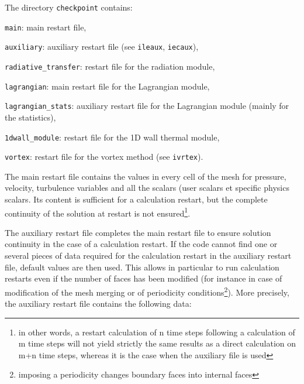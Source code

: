 {{{The directory \texttt{checkpoint} contains:
\begin{list}{-}{}
\item \texttt{main}: main restart file,
\item \texttt{auxiliary}: auxiliary restart file (see \texttt{ileaux},
                       \texttt{iecaux}),
\item \texttt{radiative\_transfer}: restart file for the radiation module,
\item \texttt{lagrangian}: main restart file for the Lagrangian module,
\item \texttt{lagrangian\_stats}: auxiliary restart file for the Lagrangian module (mainly for the statistics),
\item \texttt{1dwall\_module}: restart file for the 1D wall thermal module,
\item \texttt{vortex}: restart file for the vortex method (see
                       \texttt{ivrtex}).
\end{list}

The main restart file contains the values in every cell of the mesh for
pressure, velocity, turbulence variables and all the scalars (user scalars et specific physics scalars.
Its content is sufficient for a calculation restart, but the complete continuity of the solution at
restart is not ensured\footnote{in other words, a restart calculation of n time
steps following a calculation of m time steps will not yield strictly the same
results as a direct calculation on m+n time steps, whereas it is the case when
the auxiliary file is used}.

The auxiliary restart file completes the main restart file to ensure
solution continuity in the case of a calculation restart.
If the code cannot find one or several pieces of data required for the
calculation restart in the auxiliary restart file, default values are
then used. This allows in particular to run calculation restarts even if
the number of faces has been modified (for instance in case of
modification of the mesh merging or of periodicity
conditions\footnote{imposing a periodicity changes boundary faces into
internal faces}). More precisely, the auxiliary restart file contains
the following data:

}}}
